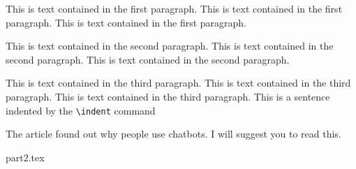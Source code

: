     {
    \vspace{10pt}
    \setlength{\parindent}{24pt}
    This is text contained in the first paragraph.
    This is text contained in the first paragraph.
    This is text contained in the first paragraph.
    \setlength{\parindent}{0pt} %
    \par    %
    This is text contained in the second paragraph.
    This is text contained in the second paragraph.
    This is text contained in the second paragraph.
    
    \setlength{\parindent}{24pt}
    \noindent %
    This \indent is text contained in the third paragraph.
    This is text contained in the third paragraph.
    This is text contained in the third paragraph.
    This is a sentence indented by the \verb|\indent| command   
    \\
    }


    The article \cite{folstad2017} found out why people use chatbots.
    I will suggest you to read this.

    \printbibliography[title={This is displayed instead of Bibliography}]

    

    {part2.tex}    %
    
